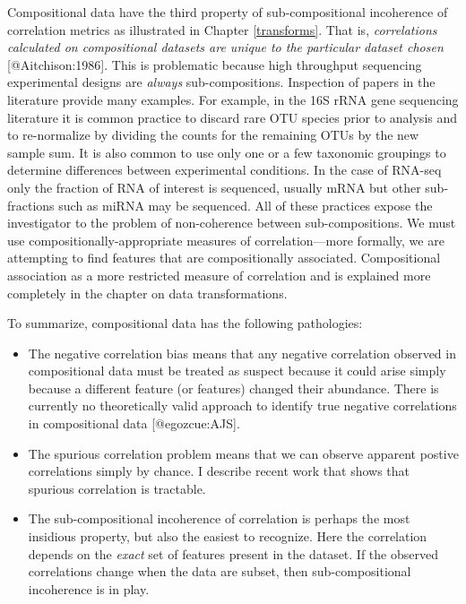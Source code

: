 \documentclass[
  onecolumn]{article}
\begin{document}
Compositional data have the third property of sub-compositional incoherence of correlation metrics as illustrated in Chapter \ref{transforms}. That is, \emph{correlations calculated on compositional datasets are unique to the particular dataset chosen} {[}@Aitchison:1986{]}. This is problematic because high throughput sequencing experimental designs are \emph{always} sub-compositions. Inspection of papers in the literature provide many examples. For example, in the 16S rRNA gene sequencing literature it is common practice to discard rare OTU species prior to analysis and to re-normalize by dividing the counts for the remaining OTUs by the new sample sum. It is also common to use only one or a few taxonomic groupings to determine differences between experimental conditions. In the case of RNA-seq only the fraction of RNA of interest is sequenced, usually mRNA but other sub-fractions such as miRNA may be sequenced. All of these practices expose the investigator to the problem of non-coherence between sub-compositions. We must use compositionally-appropriate measures of correlation---more formally, we are attempting to find features that are compositionally associated. Compositional association as a more restricted measure of correlation and is explained more completely in the chapter on data transformations.

To summarize, compositional data has the following pathologies:

\begin{itemize}
\item
  The negative correlation bias means that any negative correlation observed in compositional data must be treated as suspect because it could arise simply because a different feature (or features) changed their abundance. There is currently no theoretically valid approach to identify true negative correlations in compositional data {[}@egozcue:AJS{]}.
\item
  The spurious correlation problem means that we can observe apparent postive correlations simply by chance. I describe recent work that shows that spurious correlation is tractable.
\item
  The sub-compositional incoherence of correlation is perhaps the most insidious property, but also the easiest to recognize. Here the correlation depends on the \emph{exact} set of features present in the dataset. If the observed correlations change when the data are subset, then sub-compositional incoherence is in play.
\end{itemize}
\end{document}
